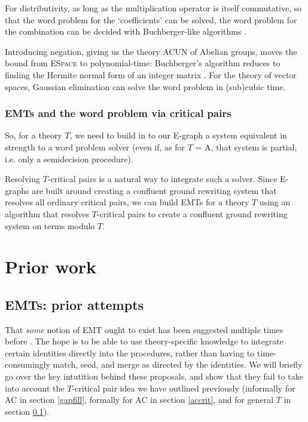 \documentclass[12pt,a4paper,twoside,openright]{report}
\numberwithin{equation}{chapter}		%
\numberwithin{figure}{chapter}			%
\numberwithin{table}{chapter}			%
\theoremstyle{definition}
\theoremstyle{plain}
\begin{document}
For distributivity, as long as the multiplication operator is itself commutative, so that the word problem for the `coefficients' can be solved, the word problem for the combination can be decided with Buchberger-like algorithms \cite{tiwari_decision_2000}.

Introducing negation, giving us the theory ACUN of Abelian groups, moves the bound from \textsc{ESpace} to polynomial-time: Buchberger's algorithm reduces to finding the Hermite normal form of an integer matrix \cite{kandri-rody_ideal-theoretic_1985}. For the theory of vector spaces, Gaussian elimination can solve the word problem in (sub)cubic time. 

\subsection{EMTs and the word problem via critical pairs} \label{gencritpairs}
So, for a theory $T$, we need to build in to our E-graph a system equivalent in strength to a word problem solver (even if, as for $T$ = A, that system is partial, i.e. only a semidecision procedure).

Resolving $T$-critical pairs is a natural way to integrate such a solver. Since E-graphs are built around creating a confluent ground rewriting system that resolves all ordinary critical pairs, we can build EMTs for a theory $T$ using an algorithm that resolves $T$-critical pairs to create a confluent ground rewriting system on terms modulo $T$.

\chapter{Prior work} \label{litreview}
\section{EMTs: prior attempts}
That \emph{some} notion of EMT ought to exist has been suggested multiple times before \cite{zucker_omelets_2025, panchekha_lin-graphs_2025, shanabrook_custom_2026}. The hope is to be able to use theory-specific knowledge to integrate certain identities directly into the procedures, rather than having to time-consumingly match, seed, and merge as directed by the identities. We will briefly go over the key intutition behind these proposals, and show that they fail to take into account the $T$-critical pair idea we have outlined previously (informally for AC in section \ref{gapfill}, formally for AC in section \ref{accrit}, and for general $T$ in section \ref{gencritpairs}).
\end{document}
